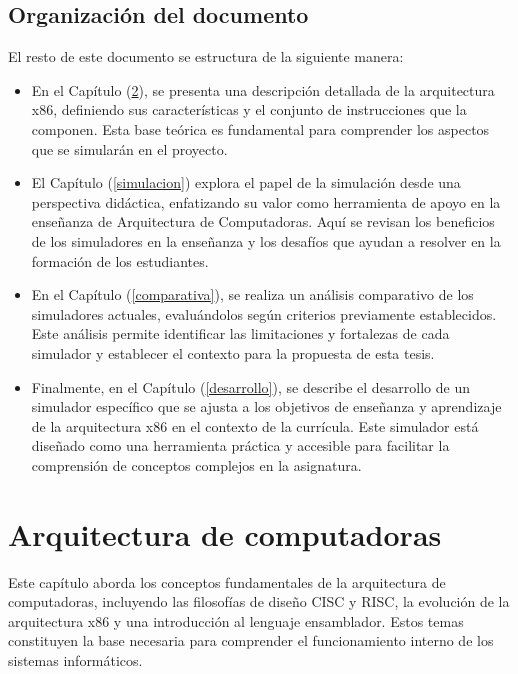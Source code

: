 \documentclass[12pt,oneside]{templates/unerthesis}
\begin{document}
\hypertarget{organizaciuxf3n-del-documento}{%
\section{Organización del documento}\label{organizaciuxf3n-del-documento}}

El resto de este documento se estructura de la siguiente manera:

\begin{itemize}
\item
  En el Capítulo (\ref{arquitectura}), se presenta una descripción detallada de la arquitectura x86, definiendo sus características y el conjunto de instrucciones que la componen. Esta base teórica es fundamental para comprender los aspectos que se simularán en el proyecto.
\item
  El Capítulo (\ref{simulacion}) explora el papel de la simulación desde una perspectiva didáctica, enfatizando su valor como herramienta de apoyo en la enseñanza de Arquitectura de Computadoras. Aquí se revisan los beneficios de los simuladores en la enseñanza y los desafíos que ayudan a resolver en la formación de los estudiantes.
\item
  En el Capítulo (\ref{comparativa}), se realiza un análisis comparativo de los simuladores actuales, evaluándolos según criterios previamente establecidos. Este análisis permite identificar las limitaciones y fortalezas de cada simulador y establecer el contexto para la propuesta de esta tesis.
\item
  Finalmente, en el Capítulo (\ref{desarrollo}), se describe el desarrollo de un simulador específico que se ajusta a los objetivos de enseñanza y aprendizaje de la arquitectura x86 en el contexto de la currícula. Este simulador está diseñado como una herramienta práctica y accesible para facilitar la comprensión de conceptos complejos en la asignatura.
\end{itemize}

\hypertarget{arquitectura}{%
\chapter{Arquitectura de computadoras}\label{arquitectura}}

Este capítulo aborda los conceptos fundamentales de la arquitectura de computadoras, incluyendo las filosofías de diseño CISC y RISC, la evolución de la arquitectura x86 y una introducción al lenguaje ensamblador. Estos temas constituyen la base necesaria para comprender el funcionamiento interno de los sistemas informáticos.
\end{document}

